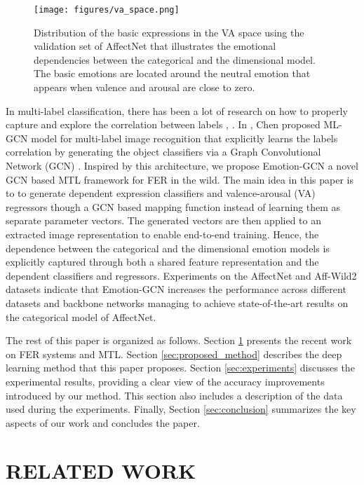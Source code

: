 \documentclass[a4paper, 10pt, conference]{ieeeconf}      \usepackage{FG2021}
\begin{document}
\begin{figure}[t]
    \centering
    \texttt{[image: figures/va\_space.png]}
    \caption{Distribution of the basic expressions in the VA space using the validation set of AffectNet that illustrates the emotional dependencies between the categorical and the dimensional model. The basic emotions are located around the neutral emotion that appears when valence and arousal are close to zero.}
    \label{fig:va_space}
\end{figure}

In multi-label classification, there has been a lot of research on how to properly capture and explore the correlation between labels \cite{li2014multi}, \cite{li2016conditional}. In \cite{chen2019multi}, Chen proposed ML-GCN model for multi-label image recognition that explicitly learns the labels correlation by generating the object classifiers via a Graph Convolutional Network (GCN) \cite{kipf2016semi}. Inspired by this architecture, we propose Emotion-GCN a novel GCN based MTL framework for FER in the wild. The main idea in this paper is to to generate dependent expression classifiers and valence-arousal (VA) regressors though a GCN based mapping function instead of learning them as separate parameter vectors. The generated vectors are then applied to an extracted image representation to enable end-to-end training. Hence, the dependence between the categorical and the dimensional emotion models is explicitly captured through both a shared feature representation and the dependent classifiers and regressors. Experiments on the AffectNet and Aff-Wild2 datasets indicate that Emotion-GCN increases the performance across different datasets and backbone networks managing to achieve state-of-the-art results on the categorical model of AffectNet.

The rest of this paper is organized as follows. Section \ref{sec:related_work} presents the recent work on FER systems and MTL. Section \ref{sec:proposed_method} describes the deep learning method that this paper proposes. Section \ref{sec:experiments} discusses the experimental results, providing a clear view of the accuracy improvements introduced by our method. This section also includes a description of the data used during the experiments. Finally, Section \ref{sec:conclusion} summarizes the key aspects of our work and concludes the paper.

\section{RELATED WORK}
\label{sec:related_work}
\end{document}
